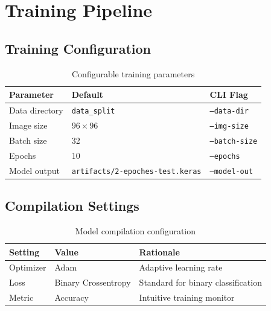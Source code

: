 \documentclass[12pt,a4paper]{article}
\begin{document}
\section{Training Pipeline}

\subsection{Training Configuration}

\begin{table}[H]
    \centering
    \caption{Configurable training parameters}
    \begin{tabular}{@{}lll@{}}
        \toprule
        \textbf{Parameter} & \textbf{Default} & \textbf{CLI Flag} \\
        \midrule
        Data directory  & \texttt{data\_split}                    & \texttt{--data-dir} \\
        Image size      & $96 \times 96$                          & \texttt{--img-size} \\
        Batch size      & 32                                      & \texttt{--batch-size} \\
        Epochs          & 10                                      & \texttt{--epochs} \\
        Model output    & \texttt{artifacts/2-epoches-test.keras} & \texttt{--model-out} \\
        \bottomrule
    \end{tabular}
\end{table}

\subsection{Compilation Settings}

\begin{table}[H]
    \centering
    \caption{Model compilation configuration}
    \begin{tabular}{@{}lll@{}}
        \toprule
        \textbf{Setting} & \textbf{Value} & \textbf{Rationale} \\
        \midrule
        Optimizer & Adam                & Adaptive learning rate \\
        Loss      & Binary Crossentropy & Standard for binary classification \\
        Metric    & Accuracy            & Intuitive training monitor \\
        \bottomrule
    \end{tabular}
\end{table}
\end{document}
